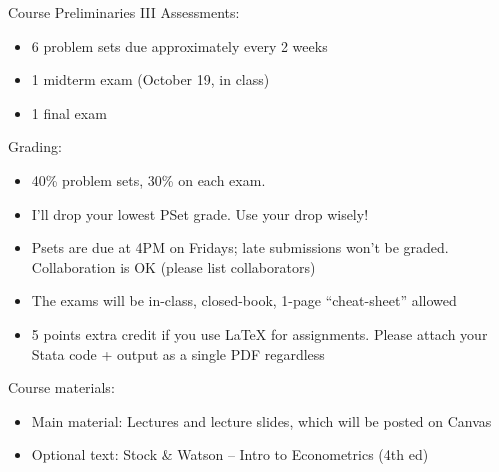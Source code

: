 \documentclass[11pt,english,handout]{beamer}
\begin{document}
\begin{frame}{Course Preliminaries III}
\vspace{0.1cm}
Assessments:
\begin{itemize}
\item 6 problem sets due approximately every 2 weeks
\item 1 midterm exam (October 19, in class)
\item 1 final exam
\vspace{0.1cm}

\end{itemize}
\vspace{0.2cm}

\pause{}

Grading:

\begin{itemize}
\item 40\% problem sets, 30\%  on each exam.
\vspace{0.1cm}
\item
 I'll drop your lowest PSet grade. Use your drop wisely!
\vspace{0.1cm}
\item Psets are due at 4PM on Fridays; late submissions won't be graded.  Collaboration is OK (please list collaborators)
\vspace{0.1cm}
\item The exams will be in-class, closed-book, 1-page ``cheat-sheet'' allowed
\vspace{0.1cm}
\item 5 points extra credit if you use LaTeX for assignments. Please attach your Stata code + output as a single PDF regardless
\end{itemize}
\vspace{0.2cm}

\pause{}
Course materials:

\begin{itemize}
\item Main material: Lectures and lecture slides, which will be posted on Canvas

\item Optional text: Stock \& Watson -- Intro to Econometrics (4th ed)

\end{itemize}

\end{frame}
\end{document}
